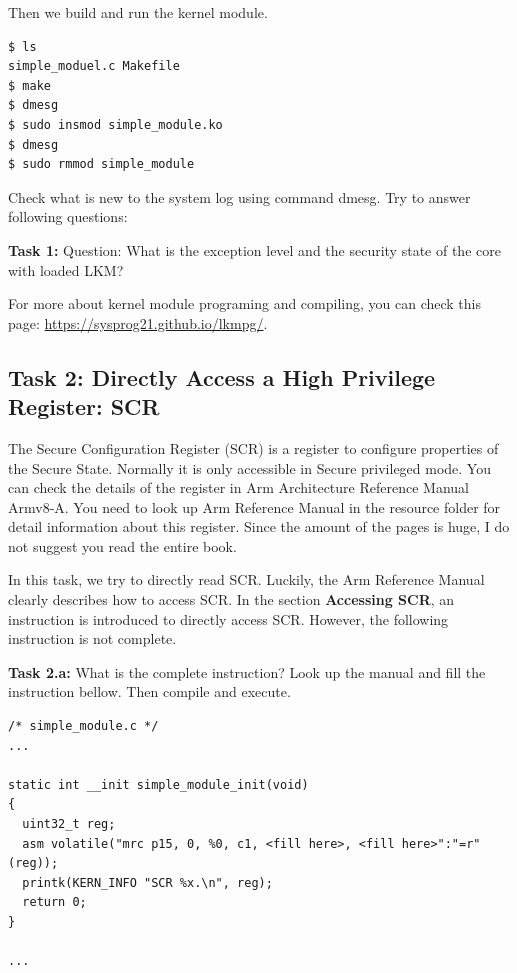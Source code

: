 Then we build and run the kernel module. 

\begin{lstlisting}
$ ls
simple_moduel.c Makefile
$ make
$ dmesg
$ sudo insmod simple_module.ko
$ dmesg
$ sudo rmmod simple_module
\end{lstlisting}


Check what is new to the system log
using command dmesg. Try to answer following questions:

\textbf{Task 1:} Question: What is the exception level and the security state of the core with loaded LKM?

For more about kernel module programing and compiling, you can check this page:
\url{https://sysprog21.github.io/lkmpg/}.

\subsection{Task 2: Directly Access a High Privilege Register: SCR}

The Secure Configuration Register (SCR) is a register to configure properties of the Secure State. Normally it is only accessible in Secure privileged mode. You can check the details of the register in Arm Architecture Reference Manual Armv8-A. You need to look up Arm Reference Manual in the resource folder for detail information about this register. Since the amount of the pages is huge, I do not suggest you read the entire book.


In this task, we try to directly read SCR. Luckily, the Arm Reference Manual clearly describes how to access SCR. In the section \textbf{Accessing SCR}, an instruction is introduced to directly access SCR. However, the following instruction is not complete. 

\textbf{Task 2.a:} What is the complete instruction? Look up the manual and fill the instruction bellow. Then compile and execute.

\begin{lstlisting}
/* simple_module.c */
...

static int __init simple_module_init(void)
{
  uint32_t reg;
  asm volatile("mrc p15, 0, %0, c1, <fill here>, <fill here>":"=r"(reg));
  printk(KERN_INFO "SCR %x.\n", reg);
  return 0;
}

...
\end{lstlisting}

